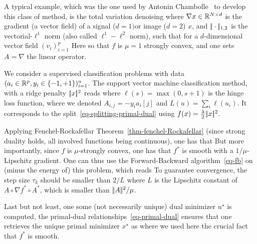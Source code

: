 \begin{exmp}[TV denoising]
A typical example, which was the one used by Antonin Chambolle~\cite{chambolle-algo-tv} to develop this class of method, is the total variation denoising
where $\nabla x \in \mathbb{R}^{N \times d}$ is the gradient (a vector field) of a signal ($d=1) $or image ($d=2$) $x$, and $|\!| \cdot |\!|_{1,2}$ is the vectorial-$\ell^1$ norm (also called $\ell^1-\ell^2$ norm), such that for a $d$-dimensional vector field $(v_i)_{i=1}^p$ 
Here 
so that $f$ is $\mu=1$ strongly convex, and one sets $A=\nabla$ the linear operator.
\end{exmp}

\begin{exmp}
	We consider a supervised classification problems with data $(a_i \in \mathbb{R}^p, y_i \in \{-1,+1\})_{i=1}^n$. 
	The support vector machine classification method, with a ridge penalty $|\!| x |\!|^2$ reads
	where $\ell(s) = \max(0,s+1)$ is the hinge loss function, where
	we denoted $A_{i,j}=-y_i a_i[j]$ and $L(u)=\sum_i \ell(u_i)$. 
	It corresponds to the split~\eqref{eq-splitting-primal-dual} using $f(x) = \frac{\lambda}{2}|\!| x |\!|^2$. 
\end{exmp}


Applying Fenchel-Rockafellar Theorem~\ref{thm-fenchel-Rockafellar} (since strong duality holds, all involved functions being continuous), one has that 
But more importantly, since $f$ is $\mu$-strongly convex, one has that $f^*$ is smooth with a $1/\mu$-Lipschitz gradient. One can thus use the Forward-Backward algorithm~\eqref{eq-fb} on (minus the energy of) this problem, which reads
To guarantee convergence, the step size $\tau_k$ should be smaller than $2/L$ where $L$ is the Lipschitz constant of $A \circ \nabla f^* \circ A^*$, which is smaller than $|\!| A |\!|^2/\mu$. 

Last but not least, one some (not necessarily unique) dual minimizer $u^\star$ is computed, the primal-dual relationships~\eqref{eq-primal-dual} ensures that one retrieves the unique primal minimizer $x^\star$ as
where we used here the crucial fact that $f^*$ is smooth.


